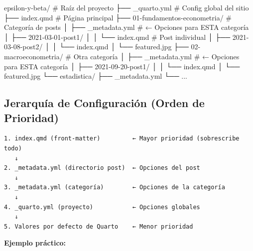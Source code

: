 \documentclass[
  doc,
  floatsintext,
  longtable,
  a4paper,
  nolmodern,
  notxfonts,
  notimes,
  12pt,
  colorlinks=true,linkcolor=blue,citecolor=blue,urlcolor=blue]{apa7}
\newenvironment{Shaded}{\begin{snugshade}}{\end{snugshade}}
\newcommand{\CommentTok}[1]{\textcolor[rgb]{0.37,0.37,0.37}{#1}}
\newcommand{\ExtensionTok}[1]{\textcolor[rgb]{0.00,0.23,0.31}{#1}}
\newcommand{\NormalTok}[1]{\textcolor[rgb]{0.00,0.23,0.31}{#1}}
\begin{document}
\begin{Shaded}
\begin{Highlighting}[]
\ExtensionTok{epsilon{-}y{-}beta/}                      \CommentTok{\# Raíz del proyecto}
\ExtensionTok{├──}\NormalTok{ \_quarto.yml                      }\CommentTok{\# Config global del sitio}
\ExtensionTok{├──}\NormalTok{ index.qmd                        }\CommentTok{\# Página principal}
\ExtensionTok{├──}\NormalTok{ 01{-}fundamentos{-}econometria/      }\CommentTok{\# Categoría de posts}
\ExtensionTok{│}\NormalTok{   ├── \_metadata.yml                }\CommentTok{\# ← Opciones para ESTA categoría}
\ExtensionTok{│}\NormalTok{   ├── 2021{-}03{-}01{-}post1/}
\ExtensionTok{│}\NormalTok{   │   └── index.qmd                }\CommentTok{\# Post individual}
\ExtensionTok{│}\NormalTok{   ├── 2021{-}03{-}08{-}post2/}
\ExtensionTok{│}\NormalTok{   │   └── index.qmd}
\ExtensionTok{│}\NormalTok{   └── featured.jpg}
\ExtensionTok{├──}\NormalTok{ 02{-}macroeconometria/             }\CommentTok{\# Otra categoría}
\ExtensionTok{│}\NormalTok{   ├── \_metadata.yml                }\CommentTok{\# ← Opciones para ESTA categoría}
\ExtensionTok{│}\NormalTok{   ├── 2021{-}09{-}20{-}post1/}
\ExtensionTok{│}\NormalTok{   │   └── index.qmd}
\ExtensionTok{│}\NormalTok{   └── featured.jpg}
\ExtensionTok{└──}\NormalTok{ estadistica/}
    \ExtensionTok{├──}\NormalTok{ \_metadata.yml}
    \ExtensionTok{└──}\NormalTok{ ...}
\end{Highlighting}
\end{Shaded}

\subsection{Jerarquía de Configuración (Orden de
Prioridad)}\label{jerarquuxeda-de-configuraciuxf3n-orden-de-prioridad}

\begin{verbatim}
1. index.qmd (front-matter)         ← Mayor prioridad (sobrescribe todo)
   ↓
2. _metadata.yml (directorio post)  ← Opciones del post
   ↓
3. _metadata.yml (categoría)        ← Opciones de la categoría
   ↓
4. _quarto.yml (proyecto)           ← Opciones globales
   ↓
5. Valores por defecto de Quarto    ← Menor prioridad
\end{verbatim}

\textbf{Ejemplo práctico:}
\end{document}
